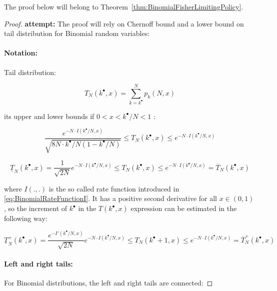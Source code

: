 \documentclass{article}
\theoremstyle{definition}
\begin{document}
The proof below will belong to Theorem~\ref{thm:BinomialFisherLimitingPolicy}.

\begin{proof}
    {\bf attempt:}
    The proof will rely on Chernoff bound \cite{paper:ChernoffBound} and a lower bound on tail distribution \cite{book:AshInformation} for Binomial random variables:

    \paragraph{Notation:}
    Tail distribution:

    \begin{equation}
        T_N(k^\bullet,x) = \sum_{k=k^\bullet}^N p_k(N,x)
    \end{equation}

    its upper and lower bounds if $0 < x < k^\bullet/N < 1$ \cite{book:AshInformation}:

    \begin{equation}
                \frac{e^{-N \cdot I(k^\bullet/N,x)}}{\sqrt{8 N \cdot k^\bullet/N (1-k^\bullet/N)}} 
        \le
        T_N(k^\bullet,x) 
        \le
        e^{-N \cdot I(k^\bullet/N,x)}
    \end{equation}

    \begin{equation}
        \underline{T}_N(k^\bullet,x) 
        =
        \frac{1}{\sqrt{2 N}} e^{-N \cdot I(k^\bullet/N,x)} 
        \le
        T_N(k^\bullet,x) 
        \le
        e^{-N \cdot I(k^\bullet/N,x)}
        =
        \overline{T}_N(k^\bullet,x)
    \end{equation}

    where $I(.,.)$ is the so called rate function introduced in \eqref{eq:BinomialRateFunctionI}.
    It has a positive second derivative for all $x \in (0,1)$, so the increment of $k^\bullet$ in the $T(k^\bullet,x)$ expression can be estimated in the following way:

    \begin{equation}
        \underline{T}^+_N(k^\bullet,x)
        =
        \frac{e^{-I'(k^\bullet/N,x)}}{\sqrt{2 N}}  e^{-N \cdot I(k^\bullet/N,x)}
        \le
        T_N(k^\bullet+1,x)
        \le
        e^{-N \cdot I(k^\bullet/N,x)}
        =
        \overline{T}^+_N(k^\bullet,x)
    \end{equation}

    \paragraph{Left and right tails:} For Binomial distributions, the left and right tails are connected:


\end{proof}
\end{document}
